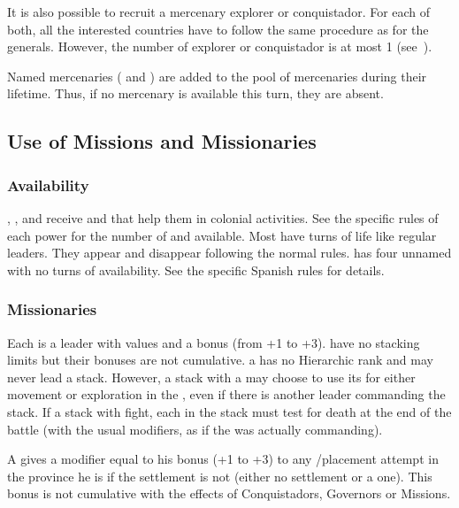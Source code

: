 \aparag It is also possible to recruit a mercenary explorer or
conquistador. For each of both, all the interested countries have to follow
the same procedure as for the generals.
\bparag However, the number of explorer or conquistador is at most 1
(see~).  

\aparag[] [BLP] Named mercenaries ( and ) are
added to the pool of mercenaries during their lifetime. Thus, if no mercenary
\LeaderE is available this turn, they are absent.




\subsection{Use of Missions and Missionaries}
\subsubsection{Availability}
\aparag \SPA, \POR, \FRA and \ANG receive \LeaderMis and  that
help them in colonial activities. See the specific rules of each power for the
number of \LeaderMis and  available.
\bparag Most \LeaderMis have turns of life like regular leaders. They appear
and disappear following the normal rules.
\bparag \HIS has four unnamed \LeaderMis with no turns of availability. See
the specific Spanish rules for details.

\subsubsection{Missionaries}
 Each \LeaderMis is a leader with values and
a bonus (from +1 to +3). \LeaderMis have no stacking limits but their bonuses
are not cumulative.
\bparag a \LeaderMis has no Hierarchic rank and may never lead a stack.
\bparag However, a stack with a \LeaderMis may choose to use its \Man for
either movement or exploration in the \ROTW, even if there is another leader
commanding the stack.
\bparag If a stack with \LeaderMis fight, each \LeaderMis in the stack must
test for death at the end of the battle (with the usual modifiers, as if the
\LeaderMis was actually commanding).

\aparag[Colonisation.] A \LeaderMis gives a modifier equal to his bonus (+1 to
+3) to any \TP/\COL placement attempt in the province he is if the settlement
is not \Faceplus (either no settlement or a \Facemoins one).
\bparag This bonus is not cumulative with the effects of Conquistadors,
Governors or Missions.


